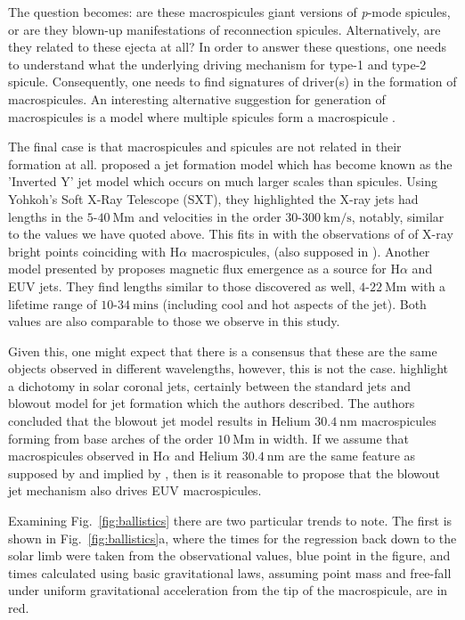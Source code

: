 The question becomes: are these macrospicules giant versions of \emph{p}-mode spicules, or are they blown-up manifestations of reconnection spicules. Alternatively, are they related to these ejecta at all? In order to answer these questions, one needs to understand what the underlying driving mechanism for type-1 and type-2 spicule. Consequently, one needs to find signatures of driver(s) in the formation of macrospicules. An interesting alternative suggestion for generation of macrospicules is a model where multiple spicules form a macrospicule \citep{Xia2005}.

The final case is that macrospicules and spicules are not related in their formation at all. \citealt{Shibata1992} proposed a jet formation model which has become known as the 'Inverted Y' jet model which occurs on much larger scales than spicules. Using Yohkoh's Soft X-Ray Telescope (SXT), they highlighted the X-ray jets had lengths in the $5$-$40\ \textrm{Mm}$ and velocities in the order $30$-$300\ \textrm{km/s}$, notably, similar to the values we have quoted above. This fits in with the observations of \citealt{Moore1977} of X-ray bright points coinciding with H$\alpha$ macrospicules, (also supposed in \citealt{Kamio2010}). Another model presented by \citealt{Jiang2007} proposes magnetic flux emergence as a source for H$\alpha$ and EUV jets. They find lengths similar to those discovered as well, $4$-$22\ \textrm{Mm}$ with a lifetime range of $10$-$34\ \textrm{mins}$ (including cool and hot aspects of the jet). Both values are also comparable to those we observe in this study.

Given this, one might expect that there is a consensus that these are the same objects observed in different wavelengths, however, this is not the case. \citealt{Moore2010} highlight a dichotomy in solar coronal jets, certainly between the standard jets \citep{Shibata1992} and blowout model for jet formation which the authors described. The authors concluded that the blowout jet model results in Helium $30.4\ \textrm{nm}$ macrospicules forming from base arches of the order $10\ \textrm{Mm}$ in width. If we assume that macrospicules observed in H$\alpha$ and Helium $30.4\ \textrm{nm}$ are the same feature as supposed by \cite{LaBonte79} and implied by \citealt{Parenti2002}, then is it reasonable to propose that the blowout jet mechanism also drives EUV macrospicules.

Examining Fig.~\ref{fig:ballistics} there are two particular trends to note. The first is shown in Fig.~\ref{fig:ballistics}a, where the times for the regression back down to the solar limb were taken from the observational values, blue point in the figure, and times calculated using basic gravitational laws, assuming point mass and free-fall under uniform gravitational acceleration from the tip of the macrospicule, are in red. 

